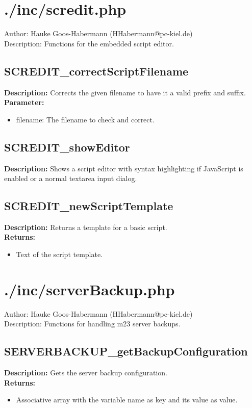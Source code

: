 \newpage\section{./inc/scredit.php}
 Author: Hauke Goos-Habermann (HHabermann@pc-kiel.de)\\
 Description: Functions for the embedded script editor.\\

\subsection{SCREDIT\_correctScriptFilename}
\textbf{Description:} Corrects the given filename to have it a valid prefix and suffix.\\
\textbf{Parameter:}
\begin{itemize}
\item filename: The filename to check and correct.
\end{itemize}

\subsection{SCREDIT\_showEditor}
\textbf{Description:} Shows a script editor with syntax highlighting if JavaScript is enabled or a normal textarea input dialog.\\

\subsection{SCREDIT\_newScriptTemplate}
\textbf{Description:} Returns a template for a basic script.\\
\textbf{Returns:}
\begin{itemize}
\item Text of the script template.
\end{itemize}

\newpage\section{./inc/serverBackup.php}
 Author: Hauke Goos-Habermann (HHabermann@pc-kiel.de)\\
 Description: Functions for handling m23 server backups.\\

\subsection{SERVERBACKUP\_getBackupConfiguration}
\textbf{Description:} Gets the server backup configuration.\\
\textbf{Returns:}
\begin{itemize}
\item Associative array with the variable name as key and its value as value.
\end{itemize}

